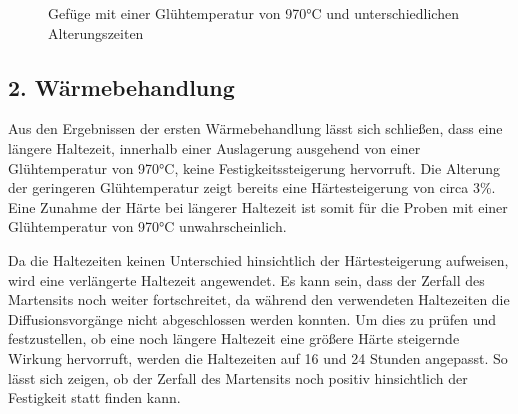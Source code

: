 \documentclass[a4paper, 11pt]{tubsreprt}
\begin{document}
\begin{figure} 		%
    \caption{Gefüge mit einer Glühtemperatur von 970°C und unterschiedlichen Alterungszeiten}
    \label{970 alterung}
\end{figure}



\subsection{2. Wärmebehandlung}
Aus den Ergebnissen der ersten Wärmebehandlung lässt sich schließen, dass eine längere Haltezeit, innerhalb einer Auslagerung ausgehend von einer Glühtemperatur von 970°C, keine Festigkeitssteigerung hervorruft. Die Alterung der geringeren Glühtemperatur zeigt bereits eine Härtesteigerung von circa 3\%. Eine Zunahme der Härte bei längerer Haltezeit ist somit für die Proben mit einer Glühtemperatur von 970°C unwahrscheinlich. 

Da die Haltezeiten keinen Unterschied hinsichtlich der Härtesteigerung aufweisen, wird eine verlängerte Haltezeit angewendet. Es kann sein, dass der Zerfall des Martensits noch weiter fortschreitet, da während den verwendeten Haltezeiten die Diffusionsvorgänge nicht abgeschlossen werden konnten. Um dies zu prüfen und festzustellen, ob eine noch längere Haltezeit eine größere Härte steigernde Wirkung hervorruft, werden die Haltezeiten auf 16 und 24 Stunden angepasst. So lässt sich zeigen, ob der Zerfall des Martensits noch positiv hinsichtlich der Festigkeit statt finden kann. 
\end{document}
